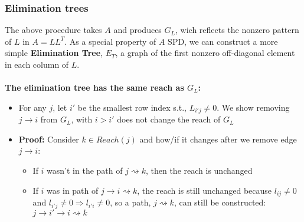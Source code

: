 \documentclass{article}
\begin{document}
\subsubsection{Elimination trees}
The above procedure takes $A$ and produces $G_L$, wich reflects the nonzero pattern of $L$ in $A=LL^T$. As a special property of $A$ SPD, we can construct a more simple \textbf{Elimination Tree}, $E_T$, a graph of the first nonzero off-diagonal element in each column of $L$.\\\\
\textbf{The elimination tree has the same reach as $G_L$:} 
\begin{itemize}
    \item For any $j$, let $i'$ be the smallest row index s.t., $L_{i'j}  \neq 0$. We show removing $j\rightarrow i$ from $G_L$, with $i > i'$ does not change the reach of $G_L$
    \item \textbf{Proof:} Consider $k \in Reach(j)$ and how/if it changes after we remove edge $j \rightarrow i$:
    \begin{itemize}
        \item If $i$ wasn't in the path of $j \rightsquigarrow k$, then the reach is unchanged
        \item If $i$ was in path of $j \rightarrow i \rightsquigarrow k$, the reach is still unchanged because $l_{ij}\neq 0$ and $l_{i'j} \neq 0 \Longrightarrow l_{i'i} \neq 0$, so a path, $j \rightsquigarrow k$, can still be constructed: $j \rightarrow i' \rightarrow i \rightsquigarrow k$
    \end{itemize}
\end{itemize}
\end{document}
